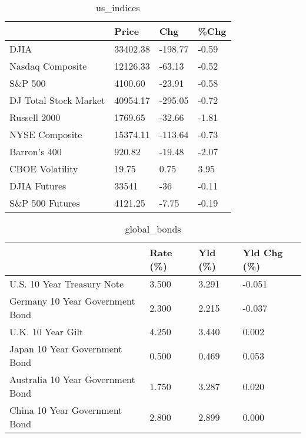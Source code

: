 \documentclass{article}%
\begin{document}
%


\begin{table}[htbp]%
\caption{us\_indices}%
\centering%
\begin{adjustbox}{width=1\textwidth}%
\begin{tabular}{llll}
\toprule
                      &    Price &     Chg &  \%Chg \\
\midrule
                 DJIA & 33402.38 & -198.77 & -0.59 \\
     Nasdaq Composite & 12126.33 &  -63.13 & -0.52 \\
              S\&P 500 &  4100.60 &  -23.91 & -0.58 \\
DJ Total Stock Market & 40954.17 & -295.05 & -0.72 \\
         Russell 2000 &  1769.65 &  -32.66 & -1.81 \\
       NYSE Composite & 15374.11 & -113.64 & -0.73 \\
         Barron's 400 &   920.82 &  -19.48 & -2.07 \\
      CBOE Volatility &    19.75 &    0.75 &  3.95 \\
         DJIA Futures &    33541 &     -36 & -0.11 \\
      S\&P 500 Futures &  4121.25 &   -7.75 & -0.19 \\
\bottomrule
\end{tabular}
%
\end{adjustbox}%
\end{table}

%


\begin{table}[htbp]%
\caption{global\_bonds}%
\centering%
\begin{adjustbox}{width=1\textwidth}%
\begin{tabular}{llll}
\toprule
                                  & Rate (\%) & Yld (\%) & Yld Chg (\%) \\
\midrule
       U.S. 10 Year Treasury Note &    3.500 &   3.291 &      -0.051 \\
  Germany 10 Year Government Bond &    2.300 &   2.215 &      -0.037 \\
                U.K. 10 Year Gilt &    4.250 &   3.440 &       0.002 \\
    Japan 10 Year Government Bond &    0.500 &   0.469 &       0.053 \\
Australia 10 Year Government Bond &    1.750 &   3.287 &       0.020 \\
    China 10 Year Government Bond &    2.800 &   2.899 &       0.000 \\
\bottomrule
\end{tabular}
%
\end{adjustbox}%
\end{table}
\end{document}
